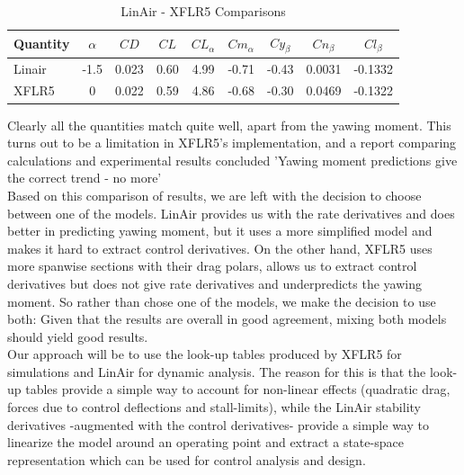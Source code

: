 \documentclass[titlepage,10pt]{article}
\begin{document}
\begin{table}[h]
\begin{center}
\begin{tabular}{|l | c | c | c | c| c|| c| c| c| }
\hline
Quantity &  $\alpha$ &$CD$ & $CL$ & $CL_{\alpha}$  &  $Cm_{\alpha}$ &  $Cy_{\beta}$ &  $Cn_{\beta}$  & $Cl_{\beta}$ \\
\hline
Linair   &  -1.5     &0.023  & 0.60  &  4.99   	   &   -0.71        &  -0.43        &  0.0031        & -0.1332  \\
XFLR5    &  0        &0.022  & 0.59  &  4.86       &   -0.68        &  -0.30        &  0.0469        & -0.1322  \\
\hline
\end{tabular}
\caption{LinAir - XFLR5 Comparisons}
\label{table:comp}
\end{center}
\end{table}

Clearly all the quantities match quite well, apart from the yawing moment. This turns out to be a limitation in XFLR5's implementation, and a report comparing calculations and experimental results concluded 'Yawing moment predictions give the correct trend - no more' \cite{XFLR5exp}\\

Based on this comparison of results, we are left with the decision to choose between one of the models. LinAir provides us with the rate derivatives and does better in predicting yawing moment, but it uses a more simplified model and makes it hard to extract control derivatives. On the other hand, XFLR5 uses more spanwise sections with their drag polars, allows us to extract control derivatives but does not give rate derivatives and underpredicts the yawing moment. So rather than chose one of the models, we make the decision to use both: Given that the results are overall in good agreement, mixing both models should yield good results.\\

Our approach will be to use the look-up tables produced by XFLR5 for simulations and LinAir for dynamic analysis. The reason for this is that the look-up tables provide a simple way to account for non-linear effects (quadratic drag, forces due to control deflections and stall-limits), while the LinAir stability derivatives -augmented with the control derivatives- provide a simple way to linearize the model around an operating point and extract a state-space representation which can be used for control analysis and design.
\end{document}
